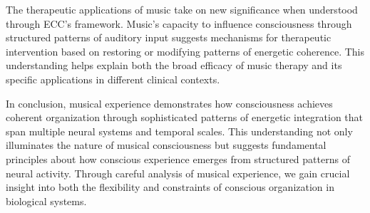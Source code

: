 The therapeutic applications of music \cite{Schaefer2014} take on new significance when understood through ECC's framework. Music's capacity to influence consciousness through structured patterns of auditory input suggests mechanisms for therapeutic intervention based on restoring or modifying patterns of energetic coherence. This understanding helps explain both the broad efficacy of music therapy and its specific applications in different clinical contexts.

In conclusion, musical experience demonstrates how consciousness achieves coherent organization through sophisticated patterns of energetic integration that span multiple neural systems and temporal scales. This understanding not only illuminates the nature of musical consciousness but suggests fundamental principles about how conscious experience emerges from structured patterns of neural activity. Through careful analysis of musical experience, we gain crucial insight into both the flexibility and constraints of conscious organization in biological systems.